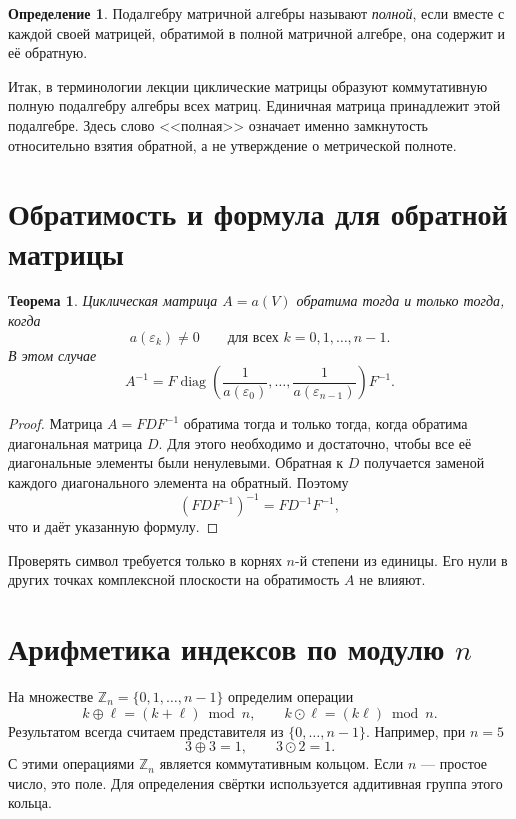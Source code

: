\documentclass[12pt,a4paper]{article}
\newtheorem{theorem}{Теорема}
\theoremstyle{definition}
\newtheorem{definition}{Определение}
\theoremstyle{remark}
\DeclareMathOperator{\diag}{diag}
\newcommand{\ZZ}{\mathbb{Z}}
\newcommand{\eps}{\varepsilon}
\begin{document}
\begin{definition}
Подалгебру матричной алгебры называют \emph{полной}, если вместе с каждой
своей матрицей, обратимой в полной матричной алгебре, она содержит и её
обратную.
\end{definition}

Итак, в терминологии лекции циклические матрицы образуют коммутативную
полную подалгебру алгебры всех матриц. Единичная матрица принадлежит этой
подалгебре. Здесь слово <<полная>> означает именно замкнутость относительно
взятия обратной, а не утверждение о метрической полноте.

\section{Обратимость и формула для обратной матрицы}

\begin{theorem}
Циклическая матрица $A=a(V)$ обратима тогда и только тогда, когда
\[
  a(\eps_k)\ne0\qquad\text{для всех }k=0,1,\dots,n-1.
\]
В этом случае
\[
  \boxed{A^{-1}=F\diag\left(
    \frac{1}{a(\eps_0)},\dots,\frac{1}{a(\eps_{n-1})}
  \right)F^{-1}}.
\]
\end{theorem}

\begin{proof}
Матрица $A=FDF^{-1}$ обратима тогда и только тогда, когда обратима
диагональная матрица $D$. Для этого необходимо и достаточно, чтобы все
её диагональные элементы были ненулевыми. Обратная к $D$ получается
заменой каждого диагонального элемента на обратный. Поэтому
\[
  (FDF^{-1})^{-1}=FD^{-1}F^{-1},
\]
что и даёт указанную формулу.
\end{proof}

Проверять символ требуется только в корнях $n$-й степени из единицы.
Его нули в других точках комплексной плоскости на обратимость $A$ не влияют.

\section{Арифметика индексов по модулю \texorpdfstring{$n$}{n}}

На множестве $\ZZ_n=\{0,1,\dots,n-1\}$ определим операции
\[
  k\oplus\ell=(k+\ell)\bmod n,\qquad
  k\odot\ell=(k\ell)\bmod n.
\]
Результатом всегда считаем представителя из $\{0,\dots,n-1\}$.
Например, при $n=5$
\[
  3\oplus3=1,\qquad 3\odot2=1.
\]
С этими операциями $\ZZ_n$ является коммутативным кольцом. Если $n$ ---
простое число, это поле. Для определения свёртки используется аддитивная
группа этого кольца.
\end{document}
